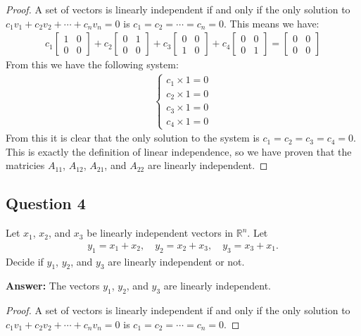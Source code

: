 \documentclass{article}
\begin{document}
\begin{proof}
A set of vectors is linearly independent if and only if 
the only solution to $c_{1}v_{1} + c_{2}v_{2} + \cdots + c_{n}v_{n} = 0$ is $c_{1} = c_{2} = \cdots = c_{n} = 0$.
This means we have:
\begin{align*}
c_{1}\begin{bmatrix} 1 & 0 \\ 0 & 0 \end{bmatrix} +
c_{2}\begin{bmatrix} 0 & 1 \\ 0 & 0 \end{bmatrix} +
c_{3}\begin{bmatrix} 0 & 0 \\ 1 & 0 \end{bmatrix} +
c_{4}\begin{bmatrix} 0 & 0 \\ 0 & 1 \end{bmatrix} =
\begin{bmatrix} 0 & 0 \\ 0 & 0 \end{bmatrix}
\end{align*}
From this we have the following system:
\begin{align*}
\begin{cases} c_{1} \times 1 = 0 \\ c_{2} \times 1 = 0 \\ c_{3} \times 1 = 0 \\ c_{4} \times 1 = 0 \end{cases}
\end{align*}
From this it is clear that the only solution to the system is $c_{1} = c_{2} = c_{3} = c_{4} = 0$.
This is exactly the definition of linear independence, so we have proven that the matricies $A_{11}$, $A_{12}$, $A_{21}$, and $A_{22}$ are linearly independent.
\end{proof}

\subsection*{Question 4}
Let \(x_{1}\), \(x_{2}\), and \(x_{3}\) be linearly independent vectors in \(\mathbb{R}^{n}\). Let
\begin{align*}
y_{1} = x_{1} + x_{2}, \quad y_{2} = x_{2} + x_{3}, \quad y_{3} = x_{3} + x_{1}.
\end{align*}
Decide if \(y_{1}\), \(y_{2}\), and \(y_{3}\) are linearly independent or not.

\noindent
\textbf{Answer:} The vectors $y_{1}$, $y_{2}$, and $y_{3}$ are linearly independent.

\begin{proof}
A set of vectors is linearly independent if and only if 
the only solution to $c_{1}v_{1} + c_{2}v_{2} + \cdots + c_{n}v_{n} = 0$ is $c_{1} = c_{2} = \cdots = c_{n} = 0$.
\end{proof}
\end{document}
